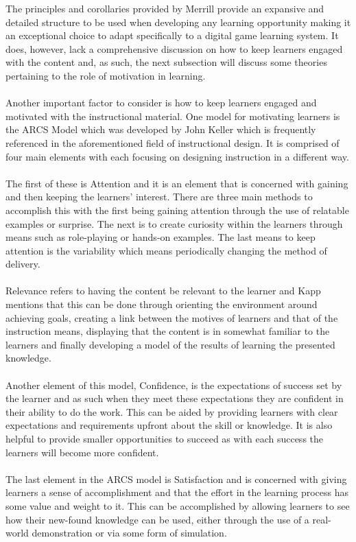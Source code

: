 \documentclass[conference]{IEEEtran}
\begin{document}
The principles and corollaries provided by Merrill\cite{Merrill2002} provide an expansive and detailed structure to be used when developing any learning opportunity making it an exceptional choice to adapt specifically to a digital game learning system.  It does, however, lack a comprehensive discussion on how to keep learners engaged with the content and, as such, the next subsection will discuss some theories pertaining to the role of motivation in learning.
\\\\
Another important factor to consider is how to keep learners engaged and motivated with the instructional material. One model for motivating learners is the ARCS Model which was developed by John Keller\cite{keller1987development} which is frequently referenced in the aforementioned field of instructional design\cite{Kapp2012a}. It is comprised of four main elements with each focusing on designing instruction in a different way\cite{Kapp2012a, keller1987development}. 
\\\\
The first of these is Attention and it is an element that is concerned with gaining and then keeping the learners’ interest. There are three main methods to accomplish this with the first being gaining attention through the use of relatable examples or surprise. The next is to create curiosity within the learners through means such as role-playing or hands-on examples. The last means to keep attention is the variability which means periodically changing the method of delivery\cite{Kapp2012a, keller1987development}.
\\\\
Relevance refers to having the content be relevant to the learner\cite{keller1987development} and Kapp\cite{Kapp2012a} mentions that this can be done through orienting the environment around achieving goals, creating a link between the motives of learners and that of the instruction means, displaying that the content is in somewhat familiar to the learners and finally developing a model of the results of learning the presented knowledge\cite{keller1987development}.
\\\\
Another element of this model, Confidence, is the expectations of success set by the learner and as such when they meet these expectations they are confident in their ability to do the work\cite{Kapp2012a, keller1987development}. This can be aided by providing learners with clear expectations and requirements upfront about the skill or knowledge. It is also helpful to provide smaller opportunities to succeed as with each success the learners will become more confident\cite{Kapp2012a, keller1987development}.
\\\\
The last element in the ARCS model is Satisfaction and is concerned with giving learners a sense of accomplishment and that the effort in the learning process has some value and weight to it\cite{Kapp2012a, keller1987development}. This can be accomplished by allowing learners to see how their new-found knowledge can be used, either through the use of a real-world demonstration or via some form of simulation\cite{Kapp2012a, keller1987development}.
\end{document}
